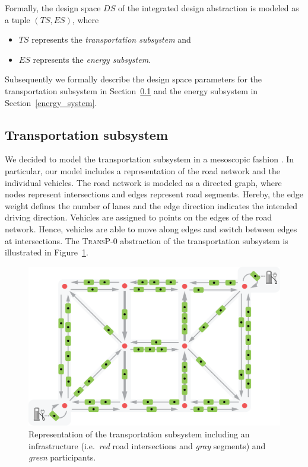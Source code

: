 Formally, the design space $DS$ of the integrated design abstraction is modeled as a tuple $(TS, ES)$, where
\begin{itemize}
	\item $TS$ represents the \textit{transportation subsystem} and
	\item $ES$ represents the \textit{energy subsystem}.
\end{itemize}
Subsequently we formally describe the design space parameters for the transportation subsystem in Section~\ref{transport} and the energy subsystem in Section~\ref{energy_system}.

\subsection{Transportation subsystem}
\label{transport}

We decided to model the transportation subsystem in a mesoscopic fashion \cite{burghout2005mesoscopic}. In particular, our model includes a representation of the road network and the individual vehicles. The road network is modeled as a directed graph, where nodes represent intersections and edges represent road segments. Hereby, the edge weight defines the number of lanes and the edge direction indicates the intended driving direction.
Vehicles are assigned to points on the edges of the road network. Hence, vehicles are able to move along edges and switch between edges at intersections. The \textsc{TransP-0} abstraction of the transportation subsystem is illustrated in Figure~\ref{transport_illustration}.

\begin{figure}[h]
	\begin{center}
	\includegraphics[trim=0 6 0 21, width=.9\columnwidth]{./gfx/transportation_system.png}
	\caption{Representation of the transportation subsystem including an infrastructure (i.e.\ \textit{red} road intersections and \textit{gray} segments) and \textit{green} participants.}
	\label{transport_illustration}
	\end{center}
\end{figure}

